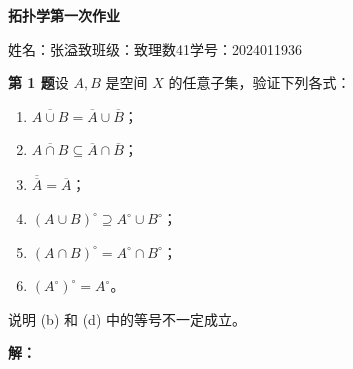 \documentclass[UTF8,a4paper,11pt,fontset=windows]{ctexart}
\newcommand{\problem}[1]{\par\addvspace{10pt}\textbf{第 #1 题}\quad}
\begin{document}
\begin{center}
  {\LARGE\bfseries 拓扑学第一次作业}\par\vspace{6pt}
  姓名：张溢致\qquad 班级：致理数41\qquad 学号：2024011936
\end{center}


\problem{1}设 $A,B$ 是空间 $X$ 的任意子集，验证下列各式：
\begin{enumerate}
  \item $\overline{A\cup B}=\overline A\cup\overline B$；
  \item $\overline{A\cap B}\subseteq\overline A\cap\overline B$；
  \item $\overline{\overline A}=\overline A$；
  \item $(A\cup B)^\circ\supseteq A^\circ\cup B^\circ$；
  \item $(A\cap B)^\circ=A^\circ\cap B^\circ$；
  \item $(A^\circ)^\circ=A^\circ$。
\end{enumerate}
说明 (b) 和 (d) 中的等号不一定成立。

\textbf{解：}
\end{document}

